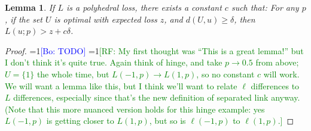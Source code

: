 \documentclass{article}
\newcommand{\Comments}{1}
\newcommand{\mynote}[2]{\ifnum\Comments=1\textcolor{#1}{#2}\fi}
\newcommand{\raf}[1]{\mynote{green}{[RF: #1]}}
\newcommand{\bo}[1]{\mynote{blue}{[Bo: #1]}}
\newtheorem{lemma}{Lemma}
\begin{document}
\begin{lemma} \label{lemma:distance-loss}
  If $L$ is a polyhedral loss, there exists a constant $c$ such that:
  For any $p$, if the set $U$ is optimal with expected loss $z$, and $d(U,u) \geq \delta$, then $L(u;p) > z + c\delta$.
\end{lemma}
\begin{proof}
  \bo{TODO}
  \raf{My first thought was ``This is a great lemma!'' but I don't think it's quite true.  Again think of hinge, and take $p\to 0.5$ from above; $U = \{1\}$ the whole time, but $L(-1,p) \to L(1,p)$, so no constant $c$ will work.  We will want a lemma like this, but I think we'll want to relate $\ell$ differences to $L$ differences, especially since that's the new definition of separated link anyway.  (Note that this more nuanced version holds for this hinge example: yes $L(-1,p)$ is getting closer to $L(1,p)$, but so is $\ell(-1,p)$ to $\ell(1,p)$.}
\end{proof}
\end{document}
